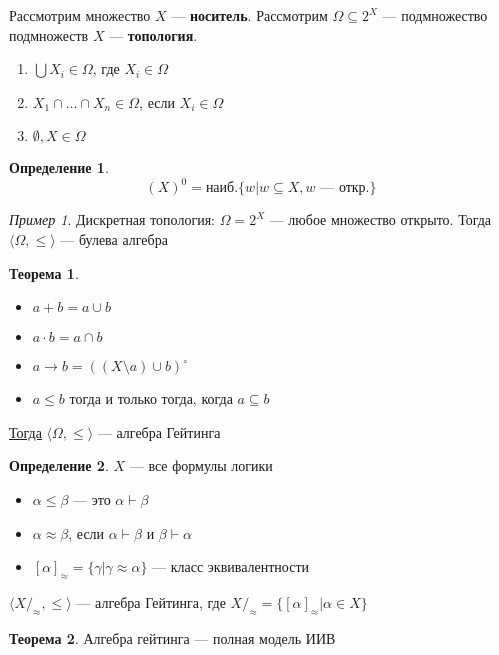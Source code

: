 \documentclass[english]{article}
\newcounter{propertycnt}
\newcommand{\beginproperty}{\setcounter{propertycnt}{1}}
\theoremstyle{plain}
\newenvironment{property}{
  \renewcommand\thepropertyinner{\arabic{propertycnt}}
  \propertyinner
}{\endpropertyinner\stepcounter{propertycnt}}
\theoremstyle{remark}
\newtheorem*{examp}{Пример}
\theoremstyle{definition}
\newtheorem{theorem}{Теорема}[section]
\newtheorem*{definition}{Определение}
\begin{document}
\begin{defintion}
Рассмотрим множество \(X\) --- \textbf{носитель}. Рассмотрим \(\Omega \subseteq 2^X\) --- подмножество подмножеств \(X\) --- \textbf{топология}.
\begin{enumerate}
\item \(\bigcup X_i \in \Omega\), где \(X_i \in \Omega\)
\item \(X_1 \cap \dots \cap X_n \in \Omega\), если \(X_i \in \Omega\)
\item \(\emptyset, X \in \Omega\)
\end{enumerate}
\end{defintion}
\begin{definition}
\[ (X)^0 = \text{наиб.}\{w \big| w \subseteq X, w\text{ --- откр.}\}\]
\end{definition}
\begin{examp}
Дискретная топология: \(\Omega = 2^X\) --- любое множество открыто. Тогда \(\langle \Omega, \le \rangle\) --- булева алгебра
\end{examp}

\begin{theorem}
\-
\begin{itemize}
\item \(a + b = a \cup b\)
\item \(a \cdot b = a \cap b\)
\item \(a \to b = \left((X \setminus a) \cup b\right)^\circ\)
\item \(a \le b\) тогда и только тогда, когда \(a \subseteq b\)
\end{itemize}
\uline{Тогда} \(\langle \Omega, \le \rangle\) --- алгебра Гейтинга
\end{theorem}
\begin{definition}
\(X\) --- все формулы логики
\begin{itemize}
\item \(\alpha \le \beta\) --- это \(\alpha \vdash \beta\)
\item \(\alpha \approx \beta\), если \(\alpha \vdash \beta\) и \(\beta \vdash \alpha\)
\item \([\alpha]_\approx = \{\gamma \big| \gamma \approx \alpha\}\) --- класс эквивалентности
\end{itemize}
\end{definition}
\beginproperty
\begin{property}
\(\langle X/_\approx, \le \rangle\) --- алгебра Гейтинга, где \(X/_\approx = \{[\alpha]_\approx \big| \alpha \in X\}\)
\end{property}
\begin{theorem}
Алгебра гейтинга --- полная модель ИИВ
\end{theorem}
\end{document}
